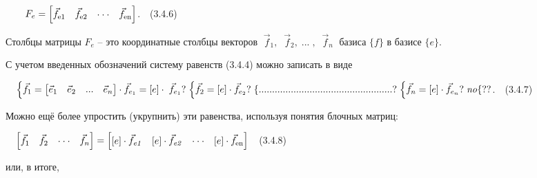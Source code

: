 \documentclass[a4paper]{article}
\newcommand\boldsubformula[1]{\text{\mathversion{bold}$#1$}}
\newcommand\normalsubformula[1]{\text{\mathversion{normal}$#1$}}
\begin{document}
{\begin{russian}\sffamily
\ \ \ \  $F_e=\left[\begin{matrix}\vec f_{\boldsubformula{\text{e1}}}&\vec f_{\boldsubformula{\text{e2}}}&\cdot \cdot
\cdot &\vec f_{\boldsubformula{\text{en}}}\end{matrix}\right]$.\ \ (3.4.6)
\end{russian}}

{\begin{russian}\sffamily
Столбцы матрицы  $F_e$ – это координатные столбцы векторов  $\;\vec f_1,\;\;\vec f_2,\;...\;,\;\;\vec f_n\;$ базиса 
$\{f\}$\textit{ }в базисе  $\{e\}$.
\end{russian}}

{\begin{russian}\sffamily
С учетом введенных обозначений систему равенств (3.4.4) можно записать в виде 
\end{russian}}

{\begin{russian}\sffamily
\ \  $\begin{matrix}\left\{\vec f_1=\left[\begin{matrix}\vec e_1\hfill\null &\vec e_2\hfill\null &...\hfill\null &\vec
e_n\hfill\null \end{matrix}\right]\cdot \vec f_{e_1}=\left[e\right]\cdot \;\vec f_{e_1}?\right.\left\{\vec
f_2=\left[e\right]\cdot \vec
f_{e_2}?\right.\left\{..................................................?\right.\left\{\vec f_n=\left[e\right]\cdot
\vec f_{e_n}?\right.\mathit{no}\hfill\null \end{matrix}\{??$.\ \ (3.4.7)
\end{russian}}

{\begin{russian}\sffamily
Можно ещё более упростить (укрупнить) эти равенства, используя понятия блочных матриц:
\end{russian}}

{\begin{russian}\sffamily
\ \  $\left[\begin{matrix}\vec f_1&\vec f_2&\cdot \cdot \cdot &\vec f_n\end{matrix}\right]=\left[\begin{matrix}[e]\cdot
\vec f_{\mathit{e1}}&[e]\cdot \vec f_{\mathit{e2}}&\cdot \cdot \cdot &[e]\cdot \vec
f_{\normalsubformula{\text{en}}}\end{matrix}\right]$\ \ (3.4.8)
\end{russian}}

{\begin{russian}\sffamily
или, в итоге,
\end{russian}}
\end{document}
